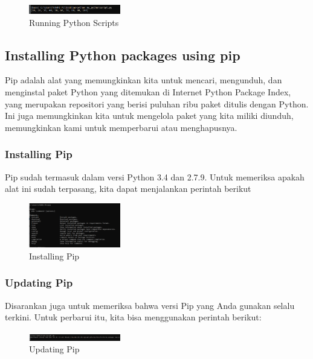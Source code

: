 	\begin{figure}[H]
		\centering
		\includegraphics[width=4cm]{figures/kelompok1/1/1174021/tugas1/materi/5.PNG}
		\caption{Running Python Scripts}
	\end{figure}

\subsection{Installing Python packages using pip}
Pip adalah alat yang memungkinkan kita untuk mencari, mengunduh, dan menginstal paket Python yang ditemukan di Internet Python Package Index, yang merupakan repositori yang berisi puluhan ribu paket ditulis dengan Python. Ini juga memungkinkan kita untuk mengelola paket yang kita miliki diunduh, memungkinkan kami untuk memperbarui atau menghapusnya.
\subsubsection{Installing Pip}
Pip sudah termasuk dalam versi Python 3.4 dan 2.7.9. Untuk memeriksa apakah alat ini sudah terpasang, kita dapat menjalankan perintah berikut
\hfill\break

	\begin{figure}[H]
		\centering
		\includegraphics[width=4cm]{figures/kelompok1/1/1174021/tugas1/materi/61.PNG}
		\caption{Installing Pip}
	\end{figure}

\subsubsection{Updating Pip}
Disarankan juga untuk memeriksa bahwa versi Pip yang Anda gunakan selalu terkini. Untuk perbarui itu, kita bisa menggunakan perintah berikut:
\hfill\break

	\begin{figure}[H]
		\centering
		\includegraphics[width=4cm]{figures/kelompok1/1/1174021/tugas1/materi/62.PNG}
		\caption{Updating Pip}
	\end{figure}

